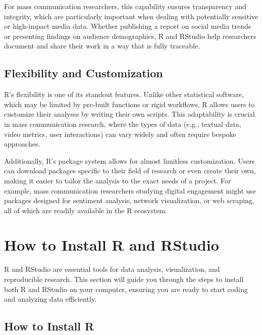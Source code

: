 \documentclass[
]{book}
\begin{document}
For mass communication researchers, this capability ensures transparency and integrity, which are particularly important when dealing with potentially sensitive or high-impact media data. Whether publishing a report on social media trends or presenting findings on audience demographics, R and RStudio help researchers document and share their work in a way that is fully traceable.

\subsection*{Flexibility and Customization}\label{flexibility-and-customization}

R's flexibility is one of its standout features. Unlike other statistical software, which may be limited by pre-built functions or rigid workflows, R allows users to customize their analyses by writing their own scripts. This adaptability is crucial in mass communication research, where the types of data (e.g., textual data, video metrics, user interactions) can vary widely and often require bespoke approaches.

Additionally, R's package system allows for almost limitless customization. Users can download packages specific to their field of research or even create their own, making it easier to tailor the analysis to the exact needs of a project. For example, mass communication researchers studying digital engagement might use packages designed for sentiment analysis, network visualization, or web scraping, all of which are readily available in the R ecosystem.

\section{How to Install R and RStudio}\label{how-to-install-r-and-rstudio}

R and RStudio are essential tools for data analysis, visualization, and reproducible research. This section will guide you through the steps to install both R and RStudio on your computer, ensuring you are ready to start coding and analyzing data efficiently.

\subsection*{How to Install R}\label{how-to-install-r}
\end{document}
